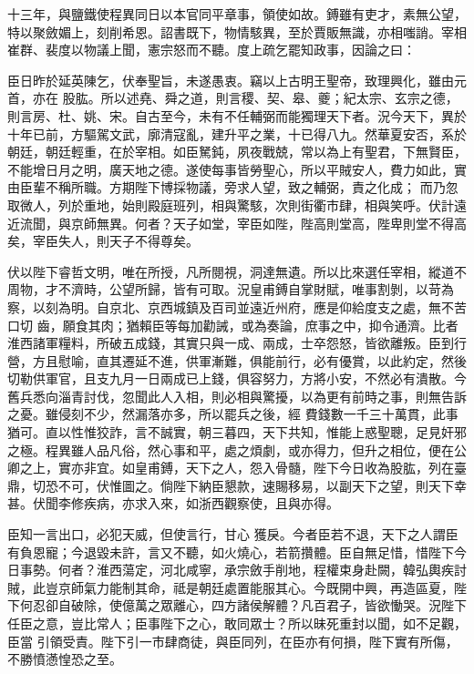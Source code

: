 \begin{pinyinscope}
 十三年，與鹽鐵使程異同日以本官同平章事，領使如故。鎛雖有吏才，素無公望，特以聚斂媚上，刻削希恩。詔書既下，物情駭異，至於賈販無識，亦相嗤誚。宰相崔群、裴度以物議上聞，憲宗怒而不聽。度上疏乞罷知政事，因論之曰：



 臣日昨於延英陳乞，伏奉聖旨，未遂愚衷。竊以上古明王聖帝，致理興化，雖由元首，亦在
 股肱。所以述堯、舜之道，則言稷、契、皋、夔；紀太宗、玄宗之德，則言房、杜、姚、宋。自古至今，未有不任輔弼而能獨理天下者。況今天下，異於十年已前，方驅駕文武，廓清寇亂，建升平之業，十已得八九。然華夏安否，系於朝廷，朝廷輕重，在於宰相。如臣駑鈍，夙夜戰兢，常以為上有聖君，下無賢臣，不能增日月之明，廣天地之德。遂使每事皆勞聖心，所以平賊安人，費力如此，實由臣輩不稱所職。方期陛下博採物議，旁求人望，致之輔弼，責之化成；
 而乃忽取微人，列於重地，始則殿庭班列，相與驚駭，次則街衢市肆，相與笑呼。伏計遠近流聞，與京師無異。何者？天子如堂，宰臣如陛，陛高則堂高，陛卑則堂不得高矣，宰臣失人，則天子不得尊矣。



 伏以陛下睿哲文明，唯在所授，凡所閱視，洞達無遺。所以比來選任宰相，縱道不周物，才不濟時，公望所歸，皆有可取。況皇甫鎛自掌財賦，唯事割剝，以苛為察，以刻為明。自京北、京西城鎮及百司並遠近州府，應是仰給度支之處，無不苦口切
 齒，願食其肉；猶賴臣等每加勸誡，或為奏論，庶事之中，抑令通濟。比者淮西諸軍糧料，所破五成錢，其實只與一成、兩成，士卒怨怒，皆欲離叛。臣到行營，方且慰喻，直其遷延不進，供軍漸難，俱能前行，必有優賞，以此約定，然後切勒供軍官，且支九月一日兩成已上錢，俱容努力，方將小安，不然必有潰散。今舊兵悉向淄青討伐，忽聞此人入相，則必相與驚擾，以為更有前時之事，則無告訴之憂。雖侵刻不少，然漏落亦多，所以罷兵之後，經
 費錢數一千三十萬貫，此事猶可。直以性惟狡詐，言不誠實，朝三暮四，天下共知，惟能上惑聖聰，足見奸邪之極。程異雖人品凡俗，然心事和平，處之煩劇，或亦得力，但升之相位，便在公卿之上，實亦非宜。如皇甫鎛，天下之人，怨入骨髓，陛下今日收為股肱，列在臺鼎，切恐不可，伏惟圖之。倘陛下納臣懇款，速賜移易，以副天下之望，則天下幸甚。伏聞李修疾病，亦求入來，如浙西觀察使，且與亦得。



 臣知一言出口，必犯天威，但使言行，甘心
 獲戾。今者臣若不退，天下之人謂臣有負恩寵；今退毀未許，言又不聽，如火燒心，若箭攢體。臣自無足惜，惜陛下今日事勢。何者？淮西蕩定，河北咸寧，承宗斂手削地，程權束身赴闕，韓弘輿疾討賊，此豈京師氣力能制其命，祗是朝廷處置能服其心。今既開中興，再造區夏，陛下何忍卻自破除，使億萬之眾離心，四方諸侯解體？凡百君子，皆欲慟哭。況陛下任臣之意，豈比常人；臣事陛下之心，敢同眾士？所以昧死重封以聞，如不足觀，臣當
 引領受責。陛下引一市肆商徒，與臣同列，在臣亦有何損，陛下實有所傷，不勝憤懣惶恐之至。




\end{pinyinscope}
